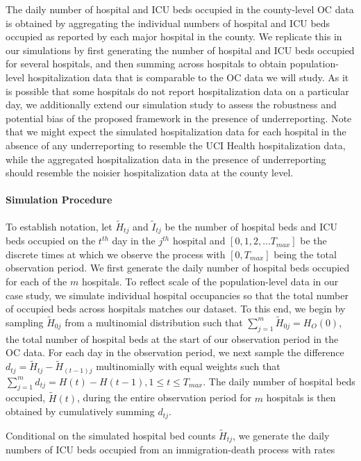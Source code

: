 \documentclass{article}
\begin{document}
The daily number of hospital and ICU beds occupied in the county-level OC data is obtained by aggregating the individual numbers of hospital and ICU beds occupied as reported by each major hospital in the county. We replicate this in our simulations by first generating the number of hospital and ICU beds occupied for several hospitals, and then summing across hospitals to obtain population-level hospitalization data that is comparable to the OC data we will study. As it is possible that some hospitals do not report hospitalization data on a particular day,  we additionally extend our simulation study to assess the robustness and potential bias of the proposed framework in the presence of underreporting. Note that we might expect the simulated hospitalization data for each hospital in the absence of any underreporting to resemble the UCI Health hospitalization data, while the aggregated hospitalization data in the presence of underreporting should resemble the noisier hospitalization data at the county level.

\paragraph{{Simulation Procedure}}
\label{sim_procedure}
To establish notation, let $\tilde{H}_{tj}$ and $\tilde{I}_{tj}$ be the number of hospital beds and ICU beds occupied on the $t^{th}$ day in the $j^{th}$ hospital and $[0, 1, 2, \ldots T_{max}]$ be the discrete times at which we observe the process with $[0, T_{max}]$ being the total observation period. We first generate the daily number of hospital beds occupied for each of the $m$ hospitals. To reflect scale of the population-level data in our case study, we simulate individual hospital occupancies so that the total number of occupied beds across hospitals matches our dataset. To this end, we begin by sampling $\tilde{H}_{0j}$ from a multinomial distribution such that $\sum_{j=1}^{m} \tilde{H}_{0j} = H_{O}(0)$, the total number of hospital beds at the start of our observation period in the OC data. For each day in the observation period, we next sample the difference $d_{tj} = \tilde{H}_{tj} -\tilde{H}_{(t-1)j}$ multinomially with equal weights such that $\sum_{j=1}^{m} d_{tj} = H(t) - H(t-1), 1 \leq t \leq T_{max}$. The daily number of hospital beds occupied, $\tilde{H}(t)$, during the entire observation period for $m$ hospitals is then obtained by cumulatively summing $d_{tj}$. \par

Conditional on the simulated hospital bed counts  $\tilde{H}_{tj}$, we generate the daily numbers of ICU beds occupied from an immigration-death process with rates 
\end{document}
